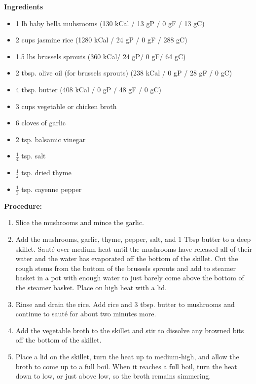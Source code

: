 \documentclass{report}
\begin{document}


\bigskip

\bigskip

\begin{multicols}{2}
\textbf{Ingredients}
\begin{itemize}
\item 1 lb baby bella muhsrooms \newline (130 kCal / 13 gP / 0 gF / 13 gC)
\item 2 cups jasmine rice \quad (1280 kCal / 24 gP / 0 gF / 288 gC)
\item 1.5 lbs brussels sprouts (360 kCal/ 24 gP/ 0 gF/ 64 gC)
\item 2 tbsp. olive oil (for brussels sprouts) \newline (238 kCal / 0 gP / 28 gF / 0 gC)
\item 4 tbsp. butter \quad (408 kCal / 0 gP / 48 gF / 0 gC)
\item 3 cups vegetable or chicken broth
\item 6 cloves of garlic
\item 2 tsp. balsamic vinegar
\item $\frac{1}{4}$ tsp. salt
\item $\frac{1}{2}$ tsp. dried thyme
\item $\frac{1}{2}$ tsp. cayenne pepper



\end{itemize}


\columnbreak
\textbf{Procedure:}
\medskip


\begin{enumerate}

\item Slice the mushrooms and mince the garlic.
\item Add the mushrooms, garlic, thyme, pepper, salt, and 1 Tbsp butter to a deep skillet. Sauté over medium heat until the mushrooms have released all of their water and the water has evaporated off the bottom of the skillet. Cut the rough stems from the bottom of the brussels sprouts and add to steamer basket in a pot with enough water to just barely come above the bottom of the steamer basket. Place on high heat with a lid. 
\item Rinse and drain the rice. Add rice and 3 tbsp. butter to mushrooms and continue to sauté for about two minutes more. 
\item Add the vegetable broth to the skillet and stir to dissolve any browned bits off the bottom of the skillet. 
\item Place a lid on the skillet, turn the heat up to medium-high, and allow the broth to come up to a full boil. When it reaches a full boil, turn the heat down to low, or just above low, so the broth remains simmering. 


\end{enumerate}
\end{multicols}
\end{document}
